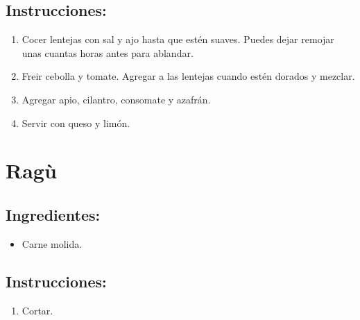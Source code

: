 \documentclass{book}
\begin{document}
\subsection*{Instrucciones:}
\begin{enumerate}
	\item Cocer lentejas con sal y ajo hasta que estén suaves.
		Puedes dejar remojar unas cuantas horas antes para ablandar.
	\item Freir cebolla y tomate.
		Agregar a las lentejas cuando estén dorados y mezclar.
	\item Agregar apio, cilantro, consomate y azafrán.
	\item Servir con queso y limón.
\end{enumerate}

\newpage
\section{Ragù}
\subsection*{Ingredientes:}
\begin{itemize}
	\item Carne molida.
\end{itemize}
\subsection*{Instrucciones:}
\begin{enumerate}
	\item Cortar.
\end{enumerate}
\end{document}
